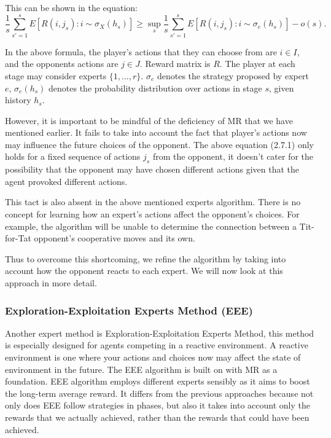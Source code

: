 \documentclass{icldt}
\numberwithin{equation}{section}       %
\begin{document}
This can be shown in the equation:
\begin{equation}
\frac{1}{s} \sum_{s'=1}^{s} E[R(i,j_s):i\sim\sigma_X(h_s)] \geq \sup_s \frac{1}{s} \sum_{s'=1}^{s} E[R(i,j_s):i\sim\sigma_e(h_s)]  - o(s).
\end{equation}

In the above formula, the player's actions that they can choose from are \(i\in I\), and the opponents actions are \(j\in J\). Reward matrix is \(R\). The player at each stage may consider experts \(\{1,…,r\}\). \(\sigma_e\) denotes the strategy proposed by expert \(e\), \(\sigma_e(h_s)\) denotes the probability distribution over actions in stage \(s\), given history \(h_s\).

However, it is important to be mindful of the deficiency of MR that we have mentioned earlier. It fails to take into account the fact that player's actions now may influence the future choices of the opponent. The above equation (2.7.1) only holds for a fixed sequence of actions \(j_s\) from the opponent, it doesn't cater for the possibility that the opponent may have chosen different actions given that the agent provoked different actions. 

This tact is also absent in the above mentioned experts algorithm. There is no concept for learning how an expert's actions affect the opponent's choices. For example, the algorithm will be unable to determine the connection between a Tit-for-Tat opponent's cooperative moves and its own.

Thus to overcome this shortcoming, we refine the algorithm by taking into account how the opponent reacts to each expert.  We will now look at this approach in more detail.

\subsubsection{Exploration-Exploitation Experts Method (EEE)}
Another expert method is Exploration-Exploitation Experts Method, this method is especially designed for agents competing in a reactive environment. A reactive environment is one where your actions and choices now may affect the state of environment in the future. The EEE algorithm is built on with MR as a foundation. EEE algorithm employs different experts sensibly as it aims to boost the long-term average reward. It differs from the previous approaches because not only does EEE follow strategies in phases, but also it takes into account only the rewards that we actually achieved, rather than the rewards that could have been achieved. \cite{experts06}
\end{document}
